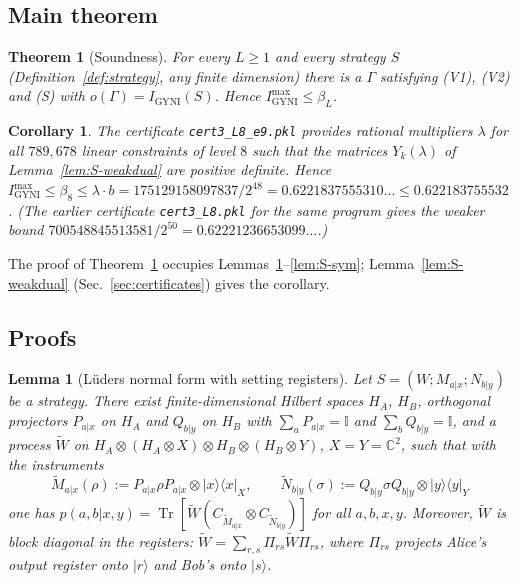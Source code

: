 \documentclass[aps,pra,onecolumn,notitlepage,superscriptaddress,longbibliography,nofootinbib,11pt]{revtex4-2}
\newtheorem{theorem}{Theorem}
\newtheorem{lemma}{Lemma}
\newtheorem{corollary}{Corollary}
\theoremstyle{remark}
\newcommand{\Tr}{\operatorname{Tr}}
\newcommand{\ket}[1]{\lvert #1\rangle}
\newcommand{\bra}[1]{\langle #1\rvert}
\newcommand{\one}{\mathbb{I}}
\newcommand{\CC}{\mathbb{C}}
\newcommand{\Igy}{I_{\mathrm{GYNI}}}
\newcommand{\Imax}{I_{\mathrm{GYNI}}^{\max}}
\newcommand{\file}[1]{\texttt{#1}}
\begin{document}
\subsection{Main theorem}

\begin{theorem}[Soundness]\label{thm:S-sound}
For every $L\ge1$ and every strategy $S$ (Definition~\ref{def:strategy}, any finite dimension) there is a $\Gamma$ satisfying (V1), (V2) and (S) with $o(\Gamma)=\Igy(S)$. Hence $\Imax\le\beta_L$.
\end{theorem}

\begin{corollary}\label{cor:S-L8}
The certificate \file{cert3\_L8\_e9.pkl} provides rational multipliers $\lambda$ for all $789{,}678$ linear constraints of level $8$ such that the matrices $Y_k(\lambda)$ of Lemma~\ref{lem:S-weakdual} are positive definite. Hence $\Imax\le\beta_8\le\lambda\cdot b=175129158097837/2^{48}=0.6221837555310\ldots\le0.622183755532$. (The earlier certificate \file{cert3\_L8.pkl} for the same program gives the weaker bound $700548845513581/2^{50}=0.62221236653099\ldots$.)
\end{corollary}

The proof of Theorem~\ref{thm:S-sound} occupies Lemmas~\ref{lem:S-lueders}--\ref{lem:S-sym}; Lemma~\ref{lem:S-weakdual} (Sec.~\ref{sec:certificates}) gives the corollary.

\subsection{Proofs}

\begin{lemma}[L\"uders normal form with setting registers]\label{lem:S-lueders}
Let $S=(W;M_{a|x};N_{b|y})$ be a strategy. There exist finite-dimensional Hilbert spaces $H_A$, $H_B$, orthogonal projectors $P_{a|x}$ on $H_A$ and $Q_{b|y}$ on $H_B$ with $\sum_aP_{a|x}=\one$ and $\sum_bQ_{b|y}=\one$, and a process $\widetilde W$ on $H_A\otimes(H_A\otimes X)\otimes H_B\otimes(H_B\otimes Y)$, $X=Y=\CC^2$, such that with the instruments
\begin{equation}
\widetilde M_{a|x}(\rho):=P_{a|x}\rho P_{a|x}\otimes\ket{x}\bra{x}_X,\qquad
\widetilde N_{b|y}(\sigma):=Q_{b|y}\sigma Q_{b|y}\otimes\ket{y}\bra{y}_Y
\end{equation}
one has $p(a,b|x,y)=\Tr[\widetilde W(C_{\widetilde M_{a|x}}\otimes C_{\widetilde N_{b|y}})]$ for all $a,b,x,y$. Moreover, $\widetilde W$ is block diagonal in the registers: $\widetilde W=\sum_{r,s}\Pi_{rs}\widetilde W\Pi_{rs}$, where $\Pi_{rs}$ projects Alice's output register onto $\ket{r}$ and Bob's onto $\ket{s}$.
\end{lemma}
\end{document}
